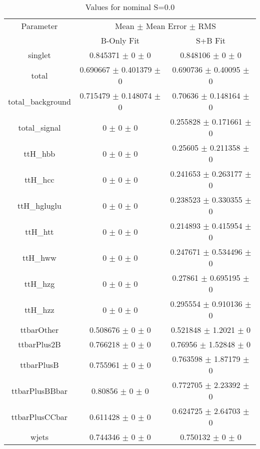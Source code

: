 \begin{table}
\centering
\caption{Values for nominal S=0.0}
\begin{tabular}{ccc}
\toprule
Parameter & \multicolumn{2}{c}{Mean $\pm$ Mean Error $\pm$ RMS}\\
 & B-Only Fit & S+B Fit\\
\midrule
singlet & \num{0.845371} $\pm$ \num{0} $\pm$ \num{0} & \num{0.848106} $\pm$ \num{0} $\pm$ \num{0}\\
total & \num{0.690667} $\pm$ \num{0.401379} $\pm$ \num{0} & \num{0.690736} $\pm$ \num{0.40095} $\pm$ \num{0}\\
total\_background & \num{0.715479} $\pm$ \num{0.148074} $\pm$ \num{0} & \num{0.70636} $\pm$ \num{0.148164} $\pm$ \num{0}\\
total\_signal & \num{0} $\pm$ \num{0} $\pm$ \num{0} & \num{0.255828} $\pm$ \num{0.171661} $\pm$ \num{0}\\
ttH\_hbb & \num{0} $\pm$ \num{0} $\pm$ \num{0} & \num{0.25605} $\pm$ \num{0.211358} $\pm$ \num{0}\\
ttH\_hcc & \num{0} $\pm$ \num{0} $\pm$ \num{0} & \num{0.241653} $\pm$ \num{0.263177} $\pm$ \num{0}\\
ttH\_hgluglu & \num{0} $\pm$ \num{0} $\pm$ \num{0} & \num{0.238523} $\pm$ \num{0.330355} $\pm$ \num{0}\\
ttH\_htt & \num{0} $\pm$ \num{0} $\pm$ \num{0} & \num{0.214893} $\pm$ \num{0.415954} $\pm$ \num{0}\\
ttH\_hww & \num{0} $\pm$ \num{0} $\pm$ \num{0} & \num{0.247671} $\pm$ \num{0.534496} $\pm$ \num{0}\\
ttH\_hzg & \num{0} $\pm$ \num{0} $\pm$ \num{0} & \num{0.27861} $\pm$ \num{0.695195} $\pm$ \num{0}\\
ttH\_hzz & \num{0} $\pm$ \num{0} $\pm$ \num{0} & \num{0.295554} $\pm$ \num{0.910136} $\pm$ \num{0}\\
ttbarOther & \num{0.508676} $\pm$ \num{0} $\pm$ \num{0} & \num{0.521848} $\pm$ \num{1.2021} $\pm$ \num{0}\\
ttbarPlus2B & \num{0.766218} $\pm$ \num{0} $\pm$ \num{0} & \num{0.76956} $\pm$ \num{1.52848} $\pm$ \num{0}\\
ttbarPlusB & \num{0.755961} $\pm$ \num{0} $\pm$ \num{0} & \num{0.763598} $\pm$ \num{1.87179} $\pm$ \num{0}\\
ttbarPlusBBbar & \num{0.80856} $\pm$ \num{0} $\pm$ \num{0} & \num{0.772705} $\pm$ \num{2.23392} $\pm$ \num{0}\\
ttbarPlusCCbar & \num{0.611428} $\pm$ \num{0} $\pm$ \num{0} & \num{0.624725} $\pm$ \num{2.64703} $\pm$ \num{0}\\
wjets & \num{0.744346} $\pm$ \num{0} $\pm$ \num{0} & \num{0.750132} $\pm$ \num{0} $\pm$ \num{0}\\
\bottomrule
\end{tabular}
\end{table}